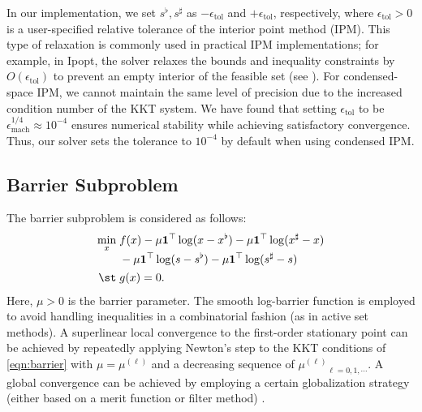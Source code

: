 In our implementation, we set $s^{\flat},s^\sharp$ as
$-\epsilon_{\text{tol}}$ and $+\epsilon_{\text{tol}}$, respectively,
where $\epsilon_{\text{tol}}>0$ is a user-specified relative tolerance
of the interior point method (IPM). This type of relaxation is
commonly used in practical IPM implementations; for example, in Ipopt,
the solver relaxes the bounds and inequality constraints by
$O(\epsilon_{\text{tol}})$ to prevent an empty interior of the
feasible set (see \cite[Section 3.5]{wachter2006implementation}).
For condensed-space IPM, we cannot maintain the same level of precision
due to the increased condition number of the KKT system.
We have found that setting $\epsilon_{\text{tol}}$ to be
$\epsilon_{\text{mach}}^{1/4}\approx 10^{-4}$ ensures numerical
stability while achieving satisfactory convergence. Thus, our solver
sets the tolerance to $10^{-4}$ by default when using condensed IPM.

\subsection{Barrier Subproblem}

The barrier subproblem is considered as follows:
\begin{subequations}\label{eqn:barrier}
  \begin{align}
    \min_{x}\;
    &
      \begin{aligned}[t]
        &f(x) - \mu\boldsymbol{1}^\top \log (x- x^\flat) -\mu\boldsymbol{1}^\top \log (x^\sharp -x)\\
        &- \mu\boldsymbol{1}^\top \log (s- s^\flat) -\mu\boldsymbol{1}^\top \log (s^\sharp -s)
      \end{aligned}
          \label{eqn:barrier-obj}\\
    \st\;
    &g(x) = 0. \label{eqn:barrier-con}
  \end{align}
\end{subequations}
Here, $\mu>0$ is the barrier parameter. The smooth log-barrier
function is employed to avoid handling inequalities in a combinatorial
fashion (as in active set methods). A superlinear local convergence to
the first-order stationary point can be achieved by repeatedly
applying Newton's step to the KKT conditions of \eqref{eqn:barrier}
with $\mu=\mu^{(\ell)}$ and a decreasing sequence of
${\mu^{(\ell)}}_{\ell=0,1,\cdots}$. A global convergence can be
achieved by employing a certain globalization strategy (either based
on a merit function or filter method) \cite{nocedal2006numerical}.


